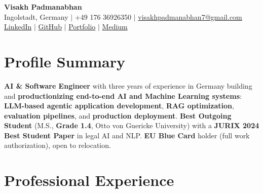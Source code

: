 \documentclass[a4paper,11pt]{article}
\begin{document}
\begin{center}
  {\LARGE \textbf{Visakh Padmanabhan}} \\[4pt]
  Ingolstadt, Germany \quad $\vert$ \quad +49 176 36926350 \quad $\vert$ \quad \href{mailto:visakhpadmanabhan7@gmail.com}{visakhpadmanabhan7@gmail.com} \\[2pt]
  \href{https://www.linkedin.com/in/visakh-padmanabhan7/}{LinkedIn} \quad $\vert$ \quad \href{https://github.com/visakhpadmanabhan7}{GitHub} \quad $\vert$ \quad \href{https://visakhpadmanabhan7.github.io/}{Portfolio} \quad $\vert$ \quad \href{https://medium.com/@visakhpadmanabhan7}{Medium}
\end{center}

\vspace{2mm}

\section{Profile Summary}
\vspace{2pt}
\small
\textbf{AI \& Software Engineer} with three years of experience in Germany building and \textbf{productionizing end-to-end AI and Machine Learning systems}: \textbf{LLM-based agentic application development}, \textbf{RAG optimization}, \textbf{evaluation pipelines}, and \textbf{production deployment}. \textbf{Best Outgoing Student} (M.S., \textbf{Grade 1.4}, Otto von Guericke University) with a \textbf{JURIX 2024 Best Student Paper} in legal AI and NLP. \textbf{EU Blue Card} holder (full work authorization), open to relocation.

\vspace{1mm}

\section{Professional Experience}
\end{document}
